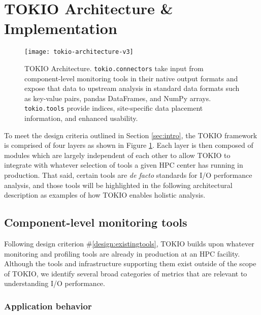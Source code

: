 \section{TOKIO Architecture \& Implementation} \label{sec:architecture}

\begin{figure}
    \centering
    \texttt{[image: tokio-architecture-v3]}
    \vspace{-.3in}
    \caption{TOKIO Architecture.  \texttt{tokio.connectors} take input from component-level monitoring tools in their native output formats and expose that data to upstream analysis in standard data formats such as key-value pairs, pandas DataFrames, and NumPy arrays. \texttt{tokio.tools} provide indices, site-specific data placement information, and enhanced usability.}
    \label{fig:tokio-architecture}
    \vspace{-.2in}
\end{figure}

To meet the design criteria outlined in Section \ref{sec:intro}, the TOKIO framework is comprised of four layers as shown in Figure \ref{fig:tokio-architecture}.
Each layer is then composed of modules which are largely independent of each other to allow TOKIO to integrate with whatever selection of tools a given HPC center has running in production.
That said, certain tools are \emph{de facto} standards for I/O performance analysis, and those tools will be highlighted in the following architectural description as examples of how TOKIO enables holistic analysis.

\subsection{Component-level monitoring tools} \label{sec:architecture/components}

Following design criterion \#\ref{design:existingtools}, TOKIO builds upon whatever monitoring and profiling tools are already in production at an HPC facility.
Although the tools and infrastructure supporting them exist outside of the scope of TOKIO, we identify several broad categories of metrics that are relevant to understanding I/O performance.

\subsubsection{Application behavior} \label{sec:architecture/components/application}

